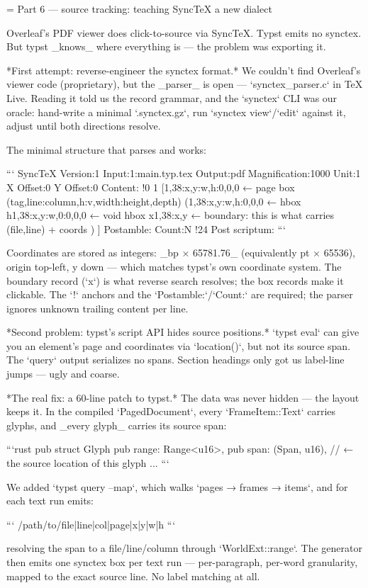 = Part 6 — source tracking: teaching SyncTeX a new dialect

Overleaf's PDF viewer does click-to-source via SyncTeX. Typst emits no
synctex. But typst _knows_ where everything is — the problem was exporting it.

*First attempt: reverse-engineer the synctex format.* We couldn't find
Overleaf's viewer code (proprietary), but the _parser_ is open —
`synctex_parser.c` in TeX Live. Reading it told us the record grammar, and
the `synctex` CLI was our oracle: hand-write a minimal `.synctex.gz`, run
`synctex view`/`edit` against it, adjust until both directions resolve.

The minimal structure that parses and works:

```
SyncTeX Version:1
Input:1:main.typ.tex
Output:pdf
Magnification:1000
Unit:1
X Offset:0
Y Offset:0
Content:
!0
{1
[1,38:x,y:w,h:0,0,0      ← page box (tag,line:column,h:v,width:height,depth)
(1,38:x,y:w,h:0,0,0      ← hbox
h1,38:x,y:w,0:0,0,0      ← void hbox
x1,38:x,y                ← boundary: this is what carries (file,line) + coords
)
]
}
Postamble:
Count:N
!24
Post scriptum:
```

Coordinates are stored as integers: _bp × 65781.76_ (equivalently pt ×
65536), origin top-left, y down — which matches typst's own coordinate
system. The boundary record (`x`) is what reverse search resolves; the box
records make it clickable. The `!` anchors and the `Postamble:`/`Count:` are
required; the parser ignores unknown trailing content per line.

*Second problem: typst's script API hides source positions.* `typst eval`
can give you an element's page and coordinates via `location()`, but not its
source span. The `query` output serializes no spans. Section headings only
got us label-line jumps — ugly and coarse.

*The real fix: a 60-line patch to typst.* The data was never hidden — the
layout keeps it. In the compiled `PagedDocument`, every `FrameItem::Text`
carries glyphs, and _every glyph_ carries its source span:

```rust
pub struct Glyph {
    pub range: Range<u16>,
    pub span: (Span, u16),   // ← the source location of this glyph
    ...
}
```

We added `typst query --map`, which walks `pages → frames → items`, and for
each text run emits:

```
/path/to/file|line|col|page|x|y|w|h
```

resolving the span to a file/line/column through `WorldExt::range`. The
generator then emits one synctex box per text run — per-paragraph, per-word
granularity, mapped to the exact source line. No label matching at all.

